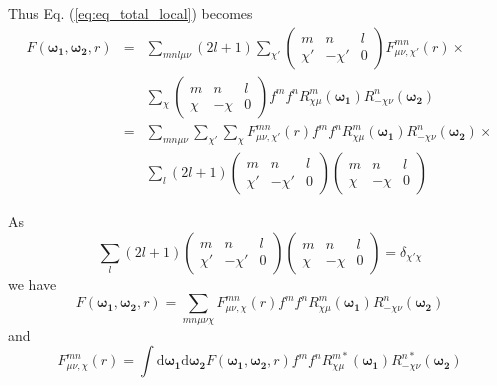 Thus Eq. (\ref{eq:eq_total_local}) becomes
\begin{eqnarray}
F(\boldsymbol{\omega_{1}},\boldsymbol{\omega_{2}},r) & = & \sum_{mnl\mu\nu}\left(2l+1\right)\sum_{\chi'}\left(\begin{array}{ccc}
m & n & l\\
\chi' & -\chi' & 0
\end{array}\right)F_{\mu\nu,\chi'}^{mn}(r)\times\nonumber \\
 &  & \sum_{\chi}\left(\begin{array}{ccc}
m & n & l\\
\chi & -\chi & 0
\end{array}\right)f^{m}f^{n}R_{\chi\mu}^{m}(\boldsymbol{\omega_{1}})R_{-\chi\nu}^{n}(\boldsymbol{\omega_{2}})\nonumber \\
 & = & \sum_{mn\mu\nu}\sum_{\chi'}\sum_{\chi}F_{\mu\nu,\chi'}^{mn}(r)f^{m}f^{n}R_{\chi\mu}^{m}(\boldsymbol{\omega_{1}})R_{-\chi\nu}^{n}(\boldsymbol{\omega_{2}})\times\nonumber \\
 &  & \sum_{l}\left(2l+1\right)\left(\begin{array}{ccc}
m & n & l\\
\chi' & -\chi' & 0
\end{array}\right)\left(\begin{array}{ccc}
m & n & l\\
\chi & -\chi & 0
\end{array}\right)
\end{eqnarray}

As
\begin{equation}
\sum_{l}\left(2l+1\right)\left(\begin{array}{ccc}
m & n & l\\
\chi' & -\chi' & 0
\end{array}\right)\left(\begin{array}{ccc}
m & n & l\\
\chi & -\chi & 0
\end{array}\right)=\delta_{\chi'\chi}
\end{equation}
we have
\begin{equation}
F(\boldsymbol{\omega_{1}},\boldsymbol{\omega_{2}},r)=\sum_{mn\mu\nu\chi}F_{\mu\nu,\chi}^{mn}(r)f^{m}f^{n}R_{\chi\mu}^{m}(\boldsymbol{\omega_{1}})R_{-\chi\nu}^{n}(\boldsymbol{\omega_{2}})\label{eq:local-forward}
\end{equation}
and
\begin{equation}
F_{\mu\nu,\chi}^{mn}(r)=\int\mathrm{d}\boldsymbol{\omega_{1}}\mathrm{d}\boldsymbol{\omega_{2}}F(\boldsymbol{\omega_{1}},\boldsymbol{\omega_{2}},r)f^{m}f^{n}R_{\chi\mu}^{m*}(\boldsymbol{\omega_{1}})R_{-\chi\nu}^{n*}(\boldsymbol{\omega_{2}})\label{eq:local_backward}
\end{equation}

